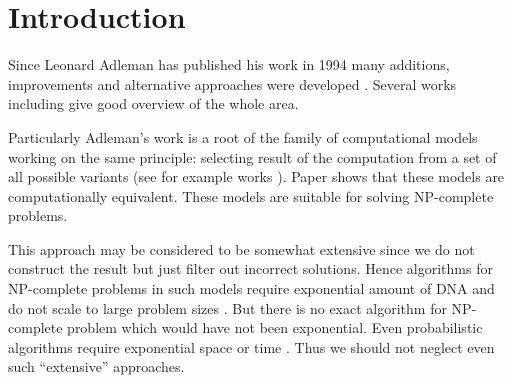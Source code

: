 \section{Introduction}

Since Leonard Adleman has published his work \cite{Adleman:1994} in 1994 many additions, improvements and alternative approaches were developed \cite{ Lipton:1994, Amos:2002, Rozenberg:knapsack, Dantsin:2003, Paun:2002}. Several works including \cite{Amos:2002, Amos:2003:Book, PaunRozenbergSalomaa:1998} give good overview of the whole area.

Particularly Adleman's work is a root of the family of computational models working on the same principle: selecting result of the computation from a set of all possible variants (see for example works \cite{Amos:1996, Adleman:1996,  Liu:1996, Rozenberg:2003}). Paper \cite{Katsanyi:2003} shows that these models are computationally equivalent. These models are suitable for solving NP-complete problems.

This approach may be considered to be somewhat extensive since we do not construct the result but just filter out incorrect solutions. Hence algorithms for NP-complete problems in such models require exponential amount of DNA and do not scale to large problem sizes \cite{Hartmanis:1995}. But there is no exact algorithm for NP-complete problem which would have not been exponential. Even probabilistic algorithms require exponential space or time \cite{Liu:2005}. Thus we should not neglect even such ``extensive'' approaches.

